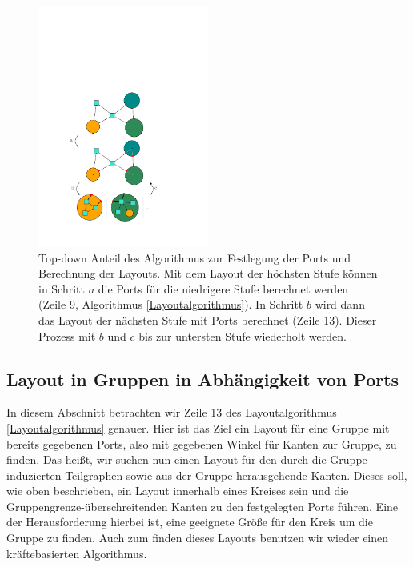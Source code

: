 \begin{figure}[h!]
\begin{center} 
  \includegraphics[width=0.5\textwidth]{Pics/TopDown.pdf}
  \caption{Top-down Anteil des Algorithmus zur Festlegung der Ports und Berechnung der Layouts.
  Mit dem Layout der höchsten Stufe können in Schritt $a$ die Ports für die niedrigere Stufe berechnet werden (Zeile 9, Algorithmus \ref{Layoutalgorithmus}).
  In Schritt $b$ wird dann das Layout der nächsten Stufe mit Ports berechnet (Zeile 13).
  Dieser Prozess mit $b$ und $c$ bis zur untersten Stufe wiederholt werden. }
  \label{f:TopDown}
\end{center}
\end{figure}







\subsection{Layout in Gruppen in Abhängigkeit von Ports}

In diesem Abschnitt betrachten wir Zeile 13 des Layoutalgorithmus \ref{Layoutalgorithmus} genauer. 
Hier ist das Ziel ein Layout für eine Gruppe mit bereits gegebenen Ports, also mit gegebenen Winkel für Kanten zur Gruppe, zu finden.
Das heißt, wir suchen nun einen Layout für den durch die Gruppe induzierten Teilgraphen sowie aus der Gruppe herausgehende Kanten.
Dieses soll, wie oben beschrieben, ein Layout innerhalb eines Kreises sein und die Gruppengrenze-überschreitenden Kanten zu den festgelegten Ports führen.
Eine der Herausforderung hierbei ist, eine geeignete Größe für den Kreis um die Gruppe zu finden. Auch zum finden dieses Layouts benutzen wir wieder einen kräftebasierten Algorithmus.

